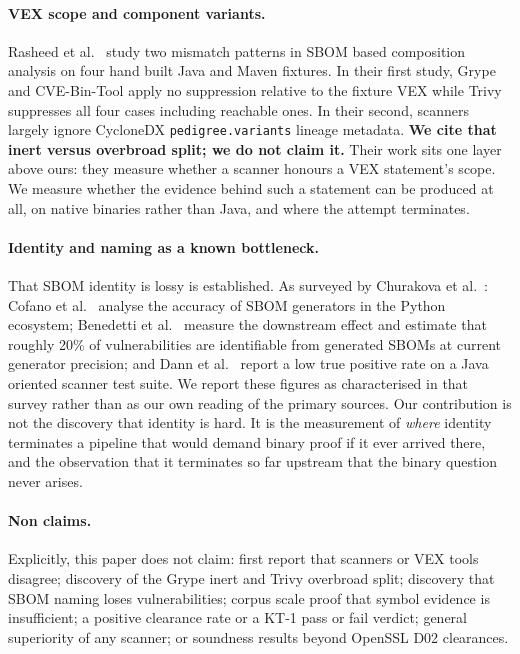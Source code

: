 \paragraph{VEX scope and component variants.} Rasheed et al.~\cite{rasheed} study
two mismatch patterns in SBOM based composition analysis on four hand built Java
and Maven fixtures. In their first study, Grype and CVE-Bin-Tool apply no
suppression relative to the fixture VEX while Trivy suppresses all four cases
including reachable ones. In their second, scanners largely ignore CycloneDX
\texttt{pedigree.variants} lineage metadata. \textbf{We cite that inert versus
overbroad split; we do not claim it.} Their work sits one layer above ours: they
measure whether a scanner honours a VEX statement's scope. We measure whether the
evidence behind such a statement can be produced at all, on native binaries
rather than Java, and where the attempt terminates.

\paragraph{Identity and naming as a known bottleneck.} That SBOM identity is
lossy is established. As surveyed by Churakova et al.~\cite{churakova}: Cofano et
al.~\cite{cofano} analyse the accuracy of SBOM generators in the Python
ecosystem; Benedetti et al.~\cite{benedetti} measure the downstream effect and
estimate that roughly 20\% of vulnerabilities are identifiable from generated
SBOMs at current generator precision; and Dann et al.~\cite{dann} report a low
true positive rate on a Java oriented scanner test suite. We report these figures as characterised in that survey rather than
as our own reading of the primary sources. Our contribution is not the discovery
that
identity is hard. It is the measurement of \emph{where} identity terminates a
pipeline that would demand binary proof if it ever arrived there, and the
observation that it terminates so far upstream that the binary question never
arises.

\paragraph{Non claims.} Explicitly, this paper does not claim: first report that
scanners or VEX tools disagree; discovery of the Grype inert and Trivy overbroad
split; discovery that SBOM naming loses vulnerabilities; corpus scale proof that
symbol evidence is insufficient; a positive clearance rate or a KT-1 pass or fail
verdict; general superiority of any scanner; or soundness results beyond OpenSSL
D02 clearances.


